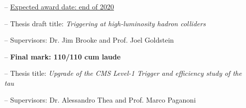 \documentclass[10pt,a4paper]{altacv}
\begin{document}

%

\begin{fullwidth}
\makecvheader
%
\end{fullwidth}





\begin{itemize}
    \setlength{\itemindent}{0.5em}
    \item[--]   \small{\underline{Expected award date: end of 2020}}
    \item[--]   \small{Thesis draft title: \textit{Triggering at high-luminosity hadron colliders}}
    \item[--]   \small{Supervisors: Dr. Jim Brooke and Prof. Joel Goldstein}
\end{itemize}

\medskip


\begin{itemize}
    \setlength{\itemindent}{0.5em}
    \item[--]   \small{\textbf{Final mark: 110/110 cum laude}}
    \item[--]   \small{Thesis title: \textit{Upgrade of the CMS Level-1 Trigger and efficiency study of the tau}}
    \item[--]   \small{Supervisors: Dr. Alessandro Thea and Prof. Marco Paganoni} 
\end{itemize}

\medskip

\end{document}
